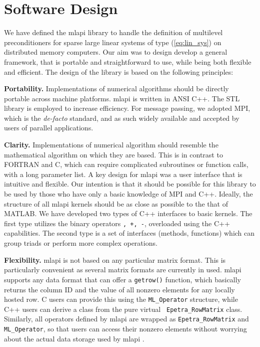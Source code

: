 \documentclass{article}[11pt]
\newcommand{\MLAPI}  {{\sc mlapi }}
\begin{document}
\section{Software Design}
\label{sec:design}

We have defined the \MLAPI library to handle the definition of multilevel
preconditioners for sparse large linear systems of type (\ref{eq:lin_sys})
  on distributed memory computers.
Our aim was to design develop a general framework, that is portable and
straightforward to use, while being both flexible and efficient. 
The design of the library is based on the following principles:

\bigskip

\noindent
{\bf Portability.} Implementations of numerical algorithms should be
directly portable across machine platforms.
\MLAPI is written in ANSI C++. The STL library is
employed to increase efficiency. For message
passing, we adopted MPI, which is the {\em de-facto} standard, and as such
widely available and accepted by users of parallel applications.

\bigskip

\noindent
{\bf Clarity.} Implementations of numerical algorithm should resemble
the mathematical algorithm on which they are based. This is in contrast to
FORTRAN and C, which can require complicated subroutines or function calls,
  with a long parameter list.
A key design for \MLAPI was a user interface that is
intuitive and flexible. Our intention is that it should be possible for this
library to be used by those who have only a basic knowledge of MPI and C++.
Ideally, the structure of all \MLAPI kernels should be as close as possible to
the that of MATLAB. We have developed two types of C++ interfaces to basic
kernels. The first type utilizes the binary operators {\tt *, +, -},
  overloaded using the C++ capabilities. The second type is a set of
  interfaces (methods, functions) which can group triads or perform more
  complex operations.

\bigskip

\noindent
{\bf Flexibility.} \MLAPI is not based on any particular matrix format. This
is particularly convenient as several matrix formats are currently in used.
\MLAPI supports any data format that can offer a {\tt getrow()} function,
  which basically returns the column ID and the value of all nonzero elements for any
  locally hosted row. C users can provide this using the {\tt ML\_Operator}
  structure, while C++ users can derive a class from the pure virtual {\tt
    Epetra\_RowMatrix} class. Similarly, all operators defined by \MLAPI are
    wrapped as {\tt Epetra\_RowMatrix} and {\tt ML\_Operator}, so that users
    can access their nonzero elements without worrying about the actual data
    storage used by \MLAPI.
\bigskip
\end{document}

